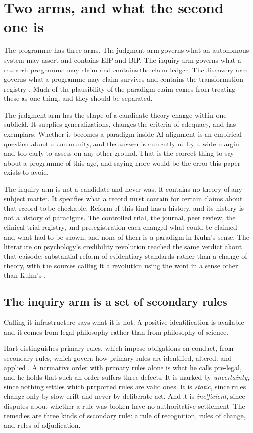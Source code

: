 \documentclass[11pt,letterpaper]{article}
\begin{document}
\section{Two arms, and what the second one is}

The programme has three arms. The judgment arm governs what an autonomous system
may assert and contains EIP and BIP. The inquiry arm governs what a research
programme may claim and contains the claim ledger. The discovery arm governs
what a programme may claim survives and contains the transformation registry
\citep{pecls,pedsc}. Much of the plausibility of the paradigm claim comes from
treating these as one thing, and they should be separated.

The judgment arm has the shape of a candidate theory change within one subfield.
It supplies generalizations, changes the criteria of adequacy, and has exemplars.
Whether it becomes a paradigm inside AI alignment is an empirical question about
a community, and the answer is currently no by a wide margin and too early to
assess on any other ground. That is the correct thing to say about a programme of
this age, and saying more would be the error this paper exists to avoid.

The inquiry arm is not a candidate and never was. It contains no theory of any
subject matter. It specifies what a record must contain for certain claims about
that record to be checkable. Reform of this kind has a history, and its history
is not a history of paradigms. The controlled trial, the journal, peer review,
the clinical trial registry, and preregistration each changed what could be
claimed and what had to be shown, and none of them is a paradigm in Kuhn's sense.
The literature on psychology's credibility revolution reached the same verdict
about that episode: substantial reform of evidentiary standards rather than a
change of theory, with the sources calling it a revolution using the word in a
sense other than Kuhn's \citep{vazire2018}.

\subsection{The inquiry arm is a set of secondary rules}

Calling it infrastructure says what it is not. A positive identification is
available and it comes from legal philosophy rather than from philosophy of
science.

Hart distinguishes primary rules, which impose obligations on conduct, from
secondary rules, which govern how primary rules are identified, altered, and
applied \citep[ch.~V]{hart1961}. A normative order with primary rules alone is
what he calls pre-legal, and he holds that such an order suffers three defects.
It is marked by \emph{uncertainty}, since nothing settles which purported rules
are valid ones. It is \emph{static}, since rules change only by slow drift and
never by deliberate act. And it is \emph{inefficient}, since disputes about
whether a rule was broken have no authoritative settlement. The remedies are
three kinds of secondary rule: a rule of recognition, rules of change, and rules
of adjudication.
\end{document}
